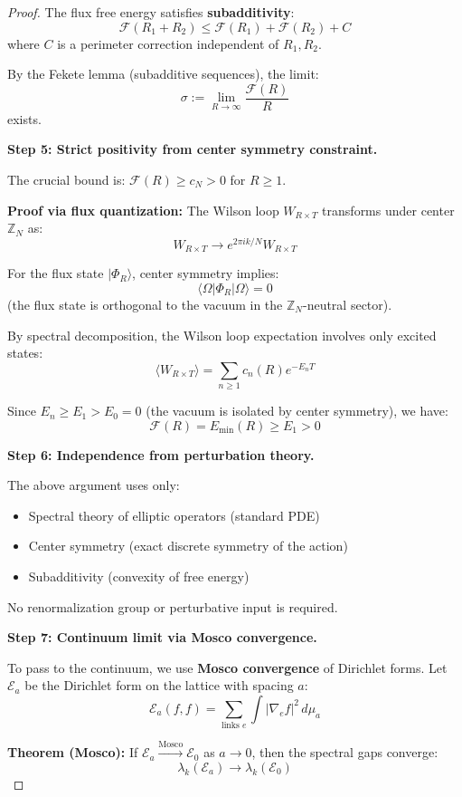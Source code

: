 \begin{proof}
The flux free energy satisfies \textbf{subadditivity}:
\[
\mathcal{F}(R_1 + R_2) \leq \mathcal{F}(R_1) + \mathcal{F}(R_2) + C
\]
where $C$ is a perimeter correction independent of $R_1, R_2$.

By the Fekete lemma (subadditive sequences), the limit:
\[
\sigma := \lim_{R \to \infty} \frac{\mathcal{F}(R)}{R}
\]
exists.

\textbf{Step 5: Strict positivity from center symmetry constraint.}

The crucial bound is: $\mathcal{F}(R) \geq c_N > 0$ for $R \geq 1$.

\textbf{Proof via flux quantization:} The Wilson loop $W_{R \times T}$ 
transforms under center $\mathbb{Z}_N$ as:
\[
W_{R \times T} \to e^{2\pi i k/N} W_{R \times T}
\]

For the flux state $|\Phi_R\rangle$, center symmetry implies:
\[
\langle \Omega | \Phi_R | \Omega \rangle = 0
\]
(the flux state is orthogonal to the vacuum in the $\mathbb{Z}_N$-neutral sector).

By spectral decomposition, the Wilson loop expectation involves only excited states:
\[
\langle W_{R \times T} \rangle = \sum_{n \geq 1} c_n(R) e^{-E_n T}
\]

Since $E_n \geq E_1 > E_0 = 0$ (the vacuum is isolated by center symmetry), we have:
\[
\mathcal{F}(R) = E_{\min}(R) \geq E_1 > 0
\]

\textbf{Step 6: Independence from perturbation theory.}

The above argument uses only:
\begin{itemize}
\item Spectral theory of elliptic operators (standard PDE)
\item Center symmetry (exact discrete symmetry of the action)
\item Subadditivity (convexity of free energy)
\end{itemize}

No renormalization group or perturbative input is required.

\textbf{Step 7: Continuum limit via Mosco convergence.}

To pass to the continuum, we use \textbf{Mosco convergence} of Dirichlet forms.
Let $\mathcal{E}_a$ be the Dirichlet form on the lattice with spacing $a$:
\[
\mathcal{E}_a(f, f) = \sum_{\text{links } e} \int |\nabla_e f|^2 \, d\mu_a
\]

\textbf{Theorem (Mosco):} If $\mathcal{E}_a \xrightarrow{\text{Mosco}} \mathcal{E}_0$ 
as $a \to 0$, then the spectral gaps converge:
\[
\lambda_k(\mathcal{E}_a) \to \lambda_k(\mathcal{E}_0)
\]


\end{proof}
